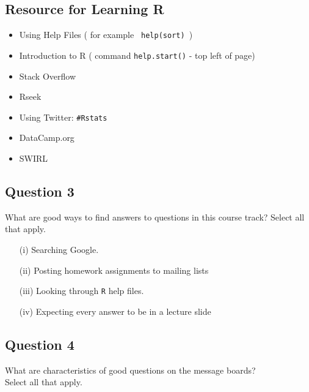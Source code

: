 \documentclass[12pt]{article}
\begin{document}
\subsection*{Resource for Learning R}


\begin{itemize}
\item  Using Help Files ( for example \texttt{ help(sort) })
\item Introduction to R ( command \texttt{help.start()} - top left of page)
\item Stack Overflow
\item Rseek
\item Using Twitter: \texttt{\#Rstats}
\item DataCamp.org
\item SWIRL
\end{itemize}

\newpage
\subsection*{Question 3}
 
What are good ways to find answers to questions in this course track? Select all that apply. 




\begin{itemize}

\item[(i)] Searching Google. 

\item[(ii)]  Posting homework assignments to mailing lists 

\item[(iii)] Looking through \texttt{R} help files. 

\item[(iv)] Expecting every answer to be in a lecture slide 
\end{itemize}

\newpage
\subsection*{Question 4}

 
What are characteristics of good questions on the message boards? \\ Select all that apply.
 
\end{document}
